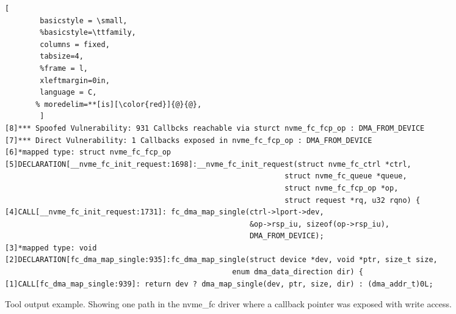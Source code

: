 \begin{figure*}[t]
\begin{adjustbox}{width=\linewidth}
        \begin{lstlisting}[
        basicstyle = \small,
        %basicstyle=\ttfamily,
        columns = fixed,
        tabsize=4,
        %frame = l,
        xleftmargin=0in,
        language = C,
       % moredelim=**[is][\color{red}]{@}{@},
        ]
[8]*** Spoofed Vulnerability: 931 Callbcks reachable via sturct nvme_fc_fcp_op : DMA_FROM_DEVICE
[7]*** Direct Vulnerability: 1 Callbacks exposed in nvme_fc_fcp_op : DMA_FROM_DEVICE
[6]*mapped type: struct nvme_fc_fcp_op
[5]DECLARATION[__nvme_fc_init_request:1698]:__nvme_fc_init_request(struct nvme_fc_ctrl *ctrl,
                                                                struct nvme_fc_queue *queue, 
                                                                struct nvme_fc_fcp_op *op, 
                                                                struct request *rq, u32 rqno) {
[4]CALL[__nvme_fc_init_request:1731]: fc_dma_map_single(ctrl->lport->dev,
                                                        &op->rsp_iu, sizeof(op->rsp_iu),
                                                        DMA_FROM_DEVICE);
[3]*mapped type: void
[2]DECLARATION[fc_dma_map_single:935]:fc_dma_map_single(struct device *dev, void *ptr, size_t size, 
                                                    enum dma_data_direction dir) {
[1]CALL[fc_dma_map_single:939]: return dev ? dma_map_single(dev, ptr, size, dir) : (dma_addr_t)0L;

                \end{lstlisting}
\end{adjustbox}
        \caption{Tool output example. Showing one path in the nvme\_fc driver where a callback pointer was exposed with write access.}
        \label{fig:tool_example}

\end{figure*}
